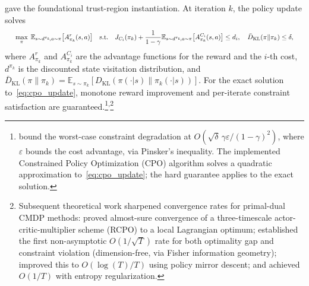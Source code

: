 \citet{Achiam2017} gave the foundational trust-region instantiation.
At iteration $k$, the policy update solves
\begin{equation}
\resizebox{.97\linewidth}{!}{$\displaystyle
  \max_\pi \; \mathbb{E}_{s \sim d^{\pi_k}\!, a \sim \pi}
    \bigl[A^r_{\pi_k}(s,a)\bigr]
  \quad \text{s.t.} \quad
  J_{C_i}(\pi_k) + \frac{1}{1-\gamma}
    \mathbb{E}_{s \sim d^{\pi_k}\!, a \sim \pi}
    \bigl[A^{C_i}_{\pi_k}(s,a)\bigr] \leq d_i,
  \quad
  \bar{D}_{\mathrm{KL}}(\pi \| \pi_k) \leq \delta,
$}
  \label{eq:cpo_update}
\end{equation}
where $A^r_{\pi_k}$ and $A^{C_i}_{\pi_k}$ are the advantage functions for
the reward and the $i$-th cost, $d^{\pi_k}$ is the discounted state
visitation distribution, and
$\bar{D}_{\mathrm{KL}}(\pi\|\pi_k)
= \mathbb{E}_{s \sim \pi_k}[D_{\mathrm{KL}}(\pi(\cdot|s)\|\pi_k(\cdot|s))]$.
For the exact solution to~\eqref{eq:cpo_update}, monotone reward improvement
and per-iterate constraint satisfaction are
guaranteed.\footnote{\citet{Achiam2017} bound the worst-case constraint
degradation at
$O(\sqrt{\delta}\,\gamma\varepsilon/(1-\gamma)^2)$, where $\varepsilon$
bounds the cost advantage, via Pinsker's inequality. The implemented
Constrained Policy Optimization (CPO) algorithm solves a quadratic
approximation to~\eqref{eq:cpo_update}; the hard guarantee applies to the
exact solution.}\textsuperscript{,}\footnote{Subsequent theoretical work
sharpened convergence rates for primal-dual CMDP methods:
\citet{Tessler2019} proved almost-sure convergence of a three-timescale
actor-critic-multiplier scheme (RCPO) to a local Lagrangian optimum;
\citet{Ding2020} established the first non-asymptotic
$O(1/\sqrt{T})$ rate for both optimality gap and constraint violation
(dimension-free, via Fisher information geometry);
\citet{Liu2022cmdp} improved this to $O(\log(T)/T)$ using policy mirror
descent; and \citet{Ying2022} achieved $O(1/T)$ with entropy
regularization.}

